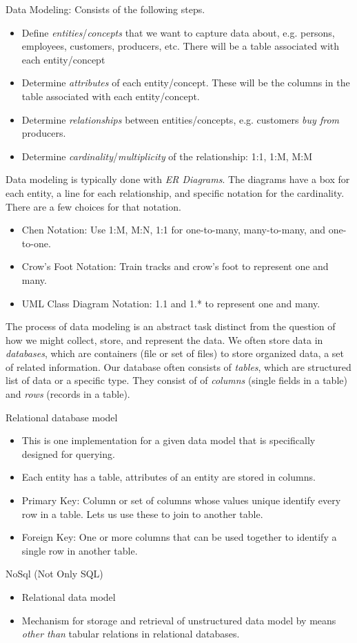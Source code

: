\documentclass[12pt]{article}
\theoremstyle{plain}
\theoremstyle{definition}
\theoremstyle{remark}
\begin{document}
Data Modeling:
Consists of the following steps.
\begin{itemize}
  \item Define \emph{entities}/\emph{concepts} that we want to capture
    data about, e.g.  persons, employees, customers, producers, etc.
    There will be a table associated with each entity/concept
  \item Determine \emph{attributes} of each entity/concept.
    These will be the columns in the table associated with each
    entity/concept.
  \item Determine \emph{relationships} between entities/concepts, e.g.
    customers \emph{buy from} producers.
  \item Determine \emph{cardinality}/\emph{multiplicity} of the
    relationship: 1:1, 1:M, M:M
\end{itemize}
Data modeling is typically done with \emph{ER Diagrams}.
The diagrams have a box for each entity, a line for each relationship,
and specific notation for the cardinality.
There are a few choices for that notation.
\begin{itemize}
  \item Chen Notation:
    Use 1:M, M:N, 1:1 for one-to-many, many-to-many, and
    one-to-one.
  \item Crow's Foot Notation:
    Train tracks and crow's foot to represent one and many.
  \item UML Class Diagram Notation:
    1.1 and 1.* to represent one and many.
\end{itemize}
The process of data modeling is an abstract task distinct from the
question of how we might collect, store, and represent the data.
We often store data in \emph{databases}, which are containers (file or
set of files) to store organized data, a set of related information.
Our database often consists of \emph{tables}, which are structured list
of data or a specific type.
They consist of of \emph{columns} (single fields in a table) and
\emph{rows} (records in a table).

Relational database model
\begin{itemize}
  \item This is one implementation for a given data model
    that is specifically designed for querying.
  \item Each entity has a table, attributes of an entity are stored in
    columns.
  \item Primary Key:
    Column or set of columns whose values unique identify every row in a
    table.
    Lets us use these to join to another table.
  \item Foreign Key:
    One or more columns that can be used together to identify a single
    row in another table.
\end{itemize}
NoSql (Not Only SQL)
\begin{itemize}
  \item Relational data model
  \item Mechanism for storage and retrieval of unstructured
    data model by means \emph{other than} tabular relations in
    relational databases.
\end{itemize}
\end{document}
